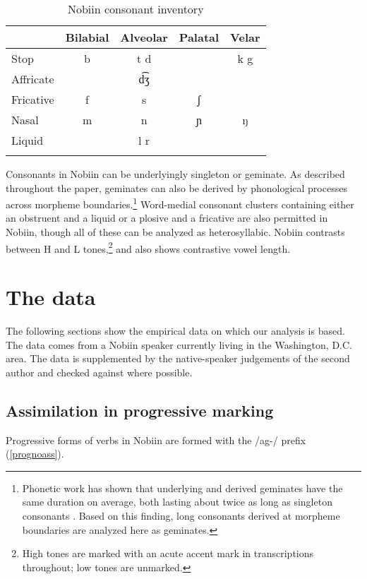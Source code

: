 \documentclass[output=paper]{langscibook}
\begin{document}
\begin{table}[h]
\centering
\begin{tabular}{l c c c c}
\lsptoprule
& Bilabial & Alveolar & Palatal & Velar\\
\midrule
Stop & b & t d & & k g  \\
Affricate & & d͡ʒ & & \\
Fricative & f & s & ʃ & \\
Nasal & m & n & ɲ & ŋ \\
Liquid & & l r & & \\
\lspbottomrule
\end{tabular}
\caption{Nobiin consonant inventory\label{inventory}}
\end{table}

Consonants in Nobiin can be underlyingly singleton or geminate. As described throughout the paper, geminates can also be derived by phonological processes across morpheme boundaries.{\footnote{Phonetic work has shown that underlying and derived geminates have the same duration on average, both lasting about twice as long as singleton consonants \citep{nobiingeminates}. Based on this finding, long consonants derived at morpheme boundaries are analyzed here as geminates.}} Word-medial consonant clusters containing either an obstruent and a liquid or a plosive and a fricative are also permitted in Nobiin, though all of these can be analyzed as heterosyllabic. Nobiin contrasts between H and L tones,\footnote{High tones are marked with an acute accent mark in transcriptions throughout; low tones are unmarked.} and also shows contrastive vowel length.
 
\section{The data} \label{data}
The following sections show the empirical data on which our analysis is based. The data comes from a Nobiin speaker currently living in the Washington, D.C. area. The data is supplemented by the native-speaker judgements of the second author and checked against \citet{werner} where possible.

\subsection{Assimilation in progressive marking}\label{progmarking}
Progressive forms of verbs in Nobiin are formed with the /ag-/ prefix (\ref{prognoass}).

%
\ea  \label{prognoass}
\end{document}
